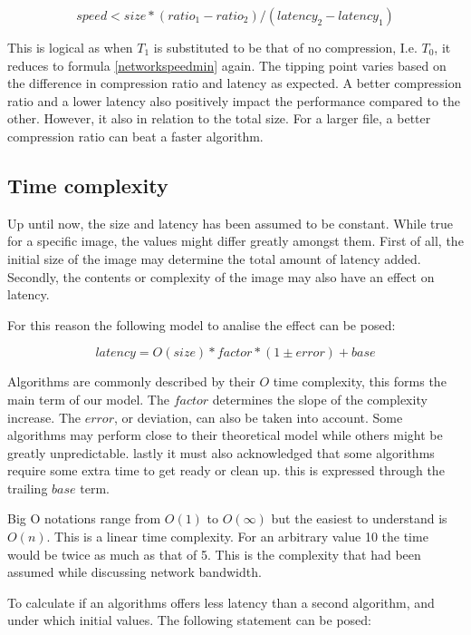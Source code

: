 \documentclass[11pt,a4paper]{report}
\begin{document}
\begin{equation}
speed < size * (ratio_1 - ratio_2) / (latency_2 - latency_1)
\end{equation}

This is logical as when $T_1$ is substituted to be that of no compression, I.e. $T_0$, it reduces to formula \ref{networkspeedmin} again. The tipping point varies based on the difference in compression ratio and latency as expected. A better compression ratio and a lower latency also positively impact the performance compared to the other. However, it also in relation to the total size. For a larger file, a better compression ratio can beat a faster algorithm. 

\subsection{Time complexity}

Up until now, the size and latency has been assumed to be constant. While true for a specific image, the values might differ greatly amongst them. First of all, the initial size of the image may determine the total amount of latency added. Secondly, the contents or complexity of the image may also have an effect on latency.

For this reason the following model to analise the effect can be posed:

\begin{equation}
latency = O(size) * factor * (1 \pm error) + base
\label{complexityfun}
\end{equation}

Algorithms are commonly described by their $O$ time complexity, this forms the main term of our model. The $factor$ determines the slope of the complexity increase. The $error$, or deviation, can also be taken into account. Some algorithms may perform close to their theoretical model while others might be greatly unpredictable. lastly it must also acknowledged that some algorithms require some extra time to get ready or clean up. this is expressed through the trailing $base$ term.

Big O notations range from $O(1)$ to $O(\infty)$ but the easiest to understand is $O(n)$. This is a linear time complexity. For an arbitrary value 10 the time would be twice as much as that of 5. This is the complexity that had been assumed while discussing network bandwidth. 

To calculate if an algorithms offers less latency than a second algorithm, and under which initial values. The following statement can be posed:
\end{document}
